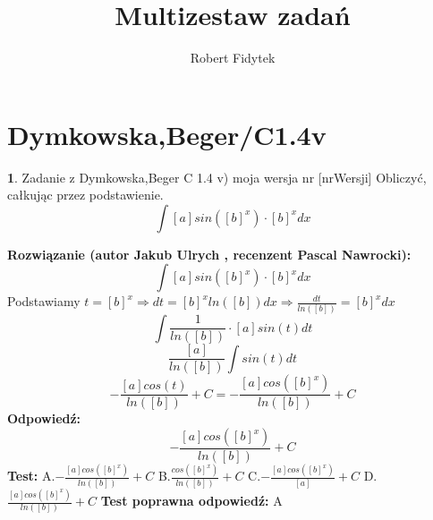 \documentclass[12pt, a4paper]{article}
\title{Multizestaw zadań}
\author{Robert Fidytek}
\date{}
\theoremstyle{definition} %
\newtheorem{zad}{}
\newcommand{\kategoria}[1]{\section{#1}} %
\newcommand{\zadStart}[1]{\begin{zad}#1\newline} %
\newcommand{\zadStop}{\end{zad}}   %
\newcommand{\rozwStart}[2]{\noindent \textbf{Rozwiązanie (autor #1 , recenzent #2): }\newline} %
\newcommand{\rozwStop}{\newline}                                            %
\newcommand{\odpStart}{\noindent \textbf{Odpowiedź:}\newline}    %
\newcommand{\odpStop}{\newline}                                             %
\newcommand{\testStart}{\noindent \textbf{Test:}\newline} %
\newcommand{\testStop}{\newline} %
\newcommand{\kluczStart}{\noindent \textbf{Test poprawna odpowiedź:}\newline} %
\newcommand{\kluczStop}{\newline} %
\begin{document}
\maketitle


\kategoria{Dymkowska,Beger/C1.4v}
\zadStart{Zadanie z Dymkowska,Beger C 1.4 v) moja wersja nr [nrWersji]}
Obliczyć, całkując przez podstawienie.$$\int [a]sin([b]^{x})\cdot[b]^{x}dx$$
\zadStop
\rozwStart{Jakub Ulrych}{Pascal Nawrocki}
$$\int [a]sin([b]^{x})\cdot[b]^{x}dx$$
Podstawiamy $t=[b]^{x}\Rightarrow dt=[b]^{x}ln([b])dx \Rightarrow\frac{dt}{ln([b])}=[b]^{x}dx$
$$\int\frac{1}{ln([b])}\cdot[a]sin(t)dt$$
$$\frac{[a]}{ln([b])}\int sin(t)dt$$
$$-\frac{[a]cos(t)}{ln([b])}+C=-\frac{[a]cos([b]^{x})}{ln([b])}+C$$
\rozwStop
\odpStart
$$-\frac{[a]cos([b]^{x})}{ln([b])}+C$$
\odpStop
\testStart
A.$-\frac{[a]cos([b]^{x})}{ln([b])}+C$
B.$\frac{cos([b]^{x})}{ln([b])}+C$
C.$-\frac{[a]cos([b]^{x})}{[a]}+C$
D.$\frac{[a]cos([b]^{x})}{ln([b])}+C$
\testStop
\kluczStart
A
\kluczStop
\end{document}
